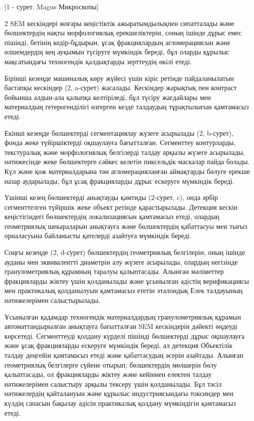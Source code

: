 [1 - сурет. Magus Микроскопы]

\begin{multicols}{2}
SEM кескіндері жоғары кеңістіктік ажыратымдылықпен сипатталады және
бөлшектердің нақты морфологиялық ерекшеліктерін, соның ішінде дұрыс емес
пішінді, бетінің кедір-бұдырын, ұсақ фракциялардың агломерациясын және
өлшемдердің кең ауқымын түсіруге мүмкіндік береді, бұл оларды құрылыс
мақсатындағы техногендік қалдықтарды зерттеудің өкілі етеді.

Бірінші кезеңде машиналық көру жүйесі үшін кіріс ретінде пайдаланылатын
бастапқы кескіндер (2, a-сурет) жасалады. Кескіндер жарықтық пен
контраст бойынша алдын-ала қалыпқа келтіріледі, бұл түсіру жағдайлары
мен материалдың гетерогенділігі өзгерген кезде талдаудың тұрақтылығын
қамтамасыз етеді.

Екінші кезеңде бөлшектерді сегментациялау жүзеге асырылады (2, b-сурет),
фонда жеке түйіршіктерді оқшаулауға бағытталған. Сегменттеу контурларды,
текстуралық және морфологиялық белгілерді талдау арқылы жүзеге
асырылады, нәтижесінде жеке бөлшектерге сәйкес келетін пиксельдік
маскалар пайда болады. Күл және қож материалдарына тән агломерацияланған
аймақтарды бөлуге ерекше назар аударылады, бұл ұсақ фракцияларды дұрыс
ескеруге мүмкіндік береді.

Үшінші кезең бөлшектерді анықтауды қамтиды (2-сурет, c), онда әрбір
сегменттелген түйіршік жеке объект ретінде қарастырылады. Детекция
кескін кеңістігіндегі бөлшектердің локализациясын қамтамасыз етеді,
олардың геометриялық шекараларын анықтауға және бөлшектердің қабаттасуы
мен тығыз орналасуына байланысты қателерді азайтуға мүмкіндік береді.

Соңғы кезеңде (2, d-сурет) бөлшектердің геометриялық белгілерін, оның
ішінде ауданы мен эквивалентті диаметрін алу жүзеге асырылады, олардың
негізінде гранулометриялық құрамның таралуы қалыптасады. Алынған
мәліметтер фракцияларды жіктеу үшін қолданылады және ұсынылған әдістің
верификациясы мен практикалық қолданылуын қамтамасыз ететін эталондық
Елек талдауының нәтижелерімен салыстырылады.

Ұсынылған қадамдар техногендік материалдардың гранулометриялық құрамын
автоматтандырылған анықтауға бағытталған SEM кескіндерін дәйекті өңдеуді
көрсетеді. Сегменттеуді қолдану күрделі пішінді бөлшектерді дұрыс
оқшаулауға және ұсақ фракцияларды ескеруге мүмкіндік береді, ал детекция
Объектілік талдау деңгейін қамтамасыз етеді және қабаттасудың әсерін
азайтады. Алынған геометриялық белгілерге сүйене отырып, бөлшектердің
мөлшерін бөлу қалыптасады, ол фракцияларды жіктеу және кейіннен електен
талдау нәтижелерімен салыстыру арқылы тексеру үшін қолданылады. Бұл
тәсіл нәтижелердің қайталануын және құрылыс индустриясындағы токсиндер
мен күлдің сапасын бақылау әдісін практикалық қолдану мүмкіндігін
қамтамасыз етеді.
\end{multicols}

